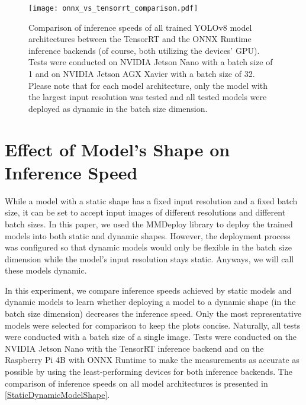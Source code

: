 
\begin{figure}[t]
    \begin{framed}
        \centering
        \texttt{[image: onnx\_vs\_tensorrt\_comparison.pdf]}
        \caption{Comparison of inference speeds of all trained YOLOv8 model
        architectures between the TensorRT and the ONNX Runtime inference backends
        (of course, both utilizing the devices' GPU). Tests were conducted on NVIDIA
        Jetson Nano with a batch size of 1 and on NVIDIA Jetson AGX Xavier with a
        batch size of 32. Please note that for each model architecture, only the
        model with the largest input resolution was tested and all tested models were
        deployed as dynamic in the batch size dimension.}
        \label{OrtVsTrtFPS}
    \end{framed}
\end{figure}




\section{Effect of Model's Shape on Inference Speed}

While a model with a static shape has a fixed input resolution and a
fixed batch size, it can be set to accept input images of different resolutions
and different batch sizes. In this paper, we used the MMDeploy library to deploy
the trained models into both static and dynamic shapes. However, the deployment
process was configured so that dynamic models would only be flexible in the
batch size dimension while the model's input resolution stays static. Anyways, we
will call these models dynamic.

In this experiment, we compare inference speeds achieved by static models and
dynamic models to learn whether deploying a model to a dynamic shape (in the
batch size dimension) decreases the inference speed. Only the most
representative models were selected for comparison to keep the plots concise.
Naturally, all tests were conducted with a batch size of a single image. Tests
were conducted on the NVIDIA Jetson Nano with the TensorRT inference backend and
on the Raspberry Pi 4B with ONNX Runtime to make the measurements as accurate as
possible by using the least-performing devices for both inference backends. The
comparison of inference speeds on all model architectures is presented in
\autoref{StaticDynamicModelShape}.

